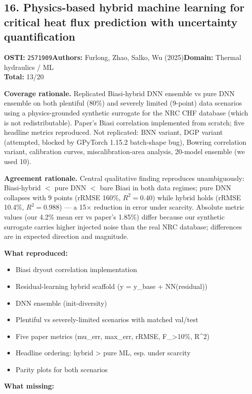 \subsection{16. Physics-based hybrid machine learning for critical heat flux prediction with uncertainty quantification}
\textbf{OSTI:} \texttt{2571909}\quad\textbf{Authors:} Furlong, Zhao, Salko, Wu (2025)\quad\textbf{Domain:} Thermal hydraulics / ML\\
\quad{}\quad\textbf{Total:} 13/20\par\smallskip
\noindent\textbf{Coverage rationale.} Replicated Biasi-hybrid DNN ensemble vs pure DNN ensemble on both plentiful (80\%) and severely limited (9-point) data scenarios using a physics-grounded synthetic surrogate for the NRC CHF database (which is not redistributable). Paper's Biasi correlation implemented from scratch; five headline metrics reproduced. Not replicated: BNN variant, DGP variant (attempted, blocked by GPyTorch 1.15.2 batch-shape bug), Bowring correlation variant, calibration curves, miscalibration-area analysis, 20-model ensemble (we used 10).\par
\noindent\textbf{Agreement rationale.} Central qualitative finding reproduces unambiguously: Biasi-hybrid $<$ pure DNN $<$ bare Biasi in both data regimes; pure DNN collapses with 9 points (rRMSE 160\%, $R^2=0.40$) while hybrid holds (rRMSE 10.4\%, $R^2=0.988$) --- a 15$\times$ reduction in error under scarcity. Absolute metric values (our 4.2\% mean err vs paper's 1.85\%) differ because our synthetic surrogate carries higher injected noise than the real NRC database; differences are in expected direction and magnitude.\par\smallskip
\noindent\textbf{What reproduced:}
\begin{itemize}[leftmargin=1.4em,itemsep=0.2em,topsep=0.2em]
\item Biasi dryout correlation implementation
\item Residual-learning hybrid scaffold (y = y\_base + NN(residual))
\item DNN ensemble (init-diversity)
\item Plentiful vs severely-limited scenarios with matched val/test
\item Five paper metrics (mu\_err, max\_err, rRMSE, F\_\textgreater{}10\%, R\textasciicircum{}2)
\item Headline ordering: hybrid \textgreater{} pure ML, esp. under scarcity
\item Parity plots for both scenarios
\end{itemize}\noindent\textbf{What missing:}
